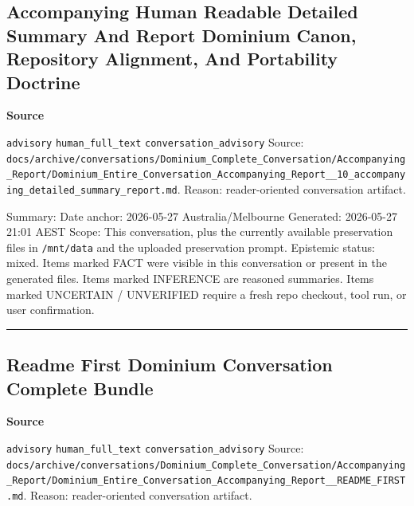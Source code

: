 \documentclass[9pt,a4paper,openany]{book}
\newcommand{\vonecallout}[3]{\par\medskip\noindent\begingroup\setlength{\fboxsep}{7pt}\colorbox{DomCalloutBg}{\parbox{0.94\linewidth}{\textbf{\textcolor{#1}{#2}}\par #3}}\endgroup\par\medskip}
\begin{document}
\subsection{Accompanying Human Readable Detailed Summary And Report Dominium Canon, Repository Alignment, And Portability Doctrine}

\vonecallout{DomSlate}{Source}{\texttt{advisory} \texttt{human\_\allowbreak{}full\_\allowbreak{}text} \texttt{conversation\_\allowbreak{}advisory} Source: \texttt{docs/\allowbreak{}archive/\allowbreak{}conversations/\allowbreak{}Dominium\_\allowbreak{}Complete\_\allowbreak{}Conversation/\allowbreak{}Accompanying\_\allowbreak{}Report/\allowbreak{}Dominium\_\allowbreak{}Entire\_\allowbreak{}Conversation\_\allowbreak{}Accompanying\_\allowbreak{}Report\_\allowbreak{}\_\allowbreak{}10\_\allowbreak{}accompanying\_\allowbreak{}detailed\_\allowbreak{}summary\_\allowbreak{}report.\allowbreak{}md}.\allowbreak{} Reason: reader-\allowbreak{}oriented conversation artifact.\allowbreak{}}

Summary: Date anchor: 2026-\allowbreak{}05-\allowbreak{}27 Australia/\allowbreak{}Melbourne Generated: 2026-\allowbreak{}05-\allowbreak{}27 21:01 AEST Scope: This conversation, plus the currently available preservation files in \texttt{/\allowbreak{}mnt/\allowbreak{}data} and the uploaded preservation prompt.\allowbreak{} Epistemic status: mixed.\allowbreak{} Items marked FACT were visible in this conversation or present in the generated files.\allowbreak{} Items marked INFERENCE are reasoned summaries.\allowbreak{} Items marked UNCERTAIN /\allowbreak{} UNVERIFIED require a fresh repo checkout, tool run, or user confirmation.\allowbreak{}


\par\medskip\hrule\medskip


\subsection{Readme First Dominium Conversation Complete Bundle}

\vonecallout{DomSlate}{Source}{\texttt{advisory} \texttt{human\_\allowbreak{}full\_\allowbreak{}text} \texttt{conversation\_\allowbreak{}advisory} Source: \texttt{docs/\allowbreak{}archive/\allowbreak{}conversations/\allowbreak{}Dominium\_\allowbreak{}Complete\_\allowbreak{}Conversation/\allowbreak{}Accompanying\_\allowbreak{}Report/\allowbreak{}Dominium\_\allowbreak{}Entire\_\allowbreak{}Conversation\_\allowbreak{}Accompanying\_\allowbreak{}Report\_\allowbreak{}\_\allowbreak{}README\_\allowbreak{}FIRST.\allowbreak{}md}.\allowbreak{} Reason: reader-\allowbreak{}oriented conversation artifact.\allowbreak{}}
\end{document}
